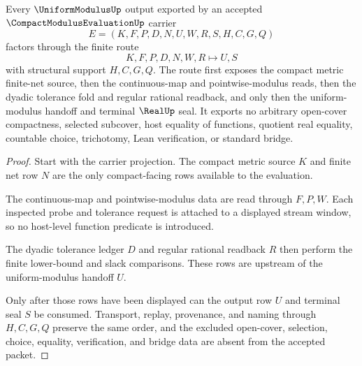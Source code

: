 \begin{theorem}
\label{thm:compact-modulus-evaluation-finite-net-route}
Every $\UniformModulusUp$ output exported by an accepted $\CompactModulusEvaluationUp$ carrier
$$
E=(K,F,P,D,N,U,W,R,S,H,C,G,Q)
$$
factors through the finite route
$$
K,F,P,D,N,W,R \longmapsto U,S
$$
with structural support $H,C,G,Q$. The route first exposes the compact metric finite-net source, then the continuous-map and pointwise-modulus reads, then the dyadic tolerance fold and regular rational readback, and only then the uniform-modulus handoff and terminal $\RealUp$ seal. It exports no arbitrary open-cover compactness, selected subcover, host equality of functions, quotient real equality, countable choice, trichotomy, Lean verification, or standard bridge.
\end{theorem}
\begin{proof}
Start with the carrier projection. The compact metric source $K$ and finite net row $N$ are the only compact-facing rows available to the evaluation.

The continuous-map and pointwise-modulus data are read through $F,P,W$. Each inspected probe and tolerance request is attached to a displayed stream window, so no host-level function predicate is introduced.

The dyadic tolerance ledger $D$ and regular rational readback $R$ then perform the finite lower-bound and slack comparisons. These rows are upstream of the uniform-modulus handoff $U$.

Only after those rows have been displayed can the output row $U$ and terminal seal $S$ be consumed. Transport, replay, provenance, and naming through $H,C,G,Q$ preserve the same order, and the excluded open-cover, selection, choice, equality, verification, and bridge data are absent from the accepted packet.
\end{proof}

